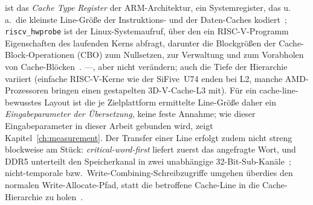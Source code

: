 \begin{nurlang}
{ist das \emph{Cache Type Register} der ARM-Architektur, ein Systemregister, das u.\,a.\ die kleinste
Line-Größe der Instruktions- und der Daten-Caches kodiert~\cite{arm_arm}; \texttt{riscv\_hwprobe} ist der
Linux-Systemaufruf, über den ein RISC-V-Programm Eigenschaften des laufenden Kerns abfragt, darunter die
Blockgrößen der Cache-Block-Operationen (CBO) zum Nullsetzen, zur Verwaltung und zum Vorabholen von
Cache-Blöcken~\cite{linux_riscv_hwprobe}.} ---,
aber nicht verändern; auch die Tiefe
der Hierarchie variiert (einfache RISC-V-Kerne wie der SiFive~U74 enden bei L2, manche AMD-Prozessoren
bringen einen
gestapelten 3D-V-Cache-L3 mit). Für ein cache-line-bewusstes Layout ist die je Zielplattform ermittelte
Line-Größe daher ein \emph{Eingabeparameter der Übersetzung}, keine feste Annahme; wie dieser
Eingabeparameter in dieser Arbeit gebunden wird, zeigt Kapitel~\ref{ch:measurement}. Der Transfer einer
Line erfolgt zudem nicht streng blockweise am Stück: \emph{critical-word-first} liefert zuerst das
angefragte Wort, und DDR5 unterteilt den Speicherkanal in zwei unabhängige
32-Bit-Sub-Kanäle~\cite{micron_ddr5}; nicht-temporale bzw.\ Write-Combining-Schreibzugriffe umgehen
überdies den normalen Write-Allocate-Pfad, statt die betroffene Cache-Line in die Cache-Hierarchie zu
holen~\cite{intel_sdm}.
\end{nurlang}
